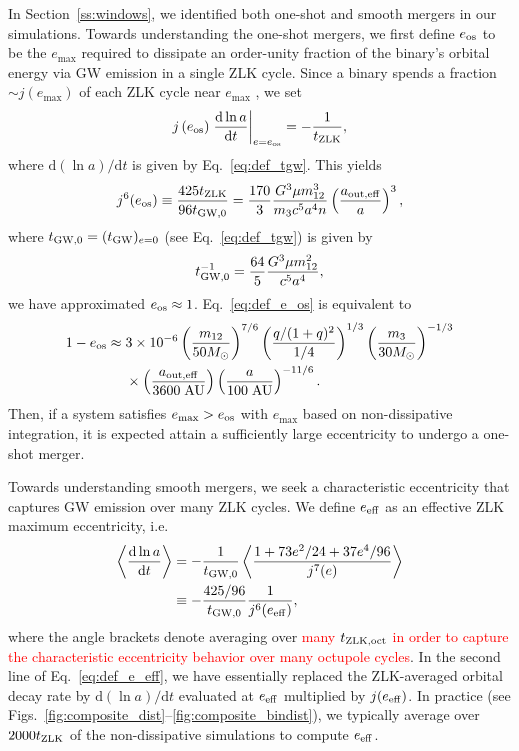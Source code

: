 \documentclass[
        fleqn,
        usenatbib,
    ]{mnras}
\newcommand*{\rd}[2]{\frac{\mathrm{d}#1}{\mathrm{d}#2}}
\newcommand*{\rdil}[2]{\mathrm{d}#1/\mathrm{d}#2}
\newcommand*{\at}[1]{\left.#1\right|}
\newcommand*{\ev}[1]{\left\langle#1\right\rangle}
\newcommand*{\p}[1]{\left(#1\right)}
\begin{document}
In Section~\ref{ss:windows}, we identified both one-shot and smooth mergers in
our simulations. Towards understanding the one-shot mergers, we first define
$e_{\rm os}$ to be the $e_{\max}$ required to dissipate an order-unity fraction
of the binary's orbital energy via GW emission in a single ZLK cycle. Since a
binary spends a fraction $\sim j(e_{\max})$ of each ZLK cycle near $e_{\max}$
\citep[e.g.,][]{anderson2016formation}, we set
\begin{align}
    j\p{e_{\rm os}}\at{\rd{\ln a}{t}}_{e = e_{\rm os}} =
        -\frac{1}{t_{\rm ZLK}},
\end{align}
where $\rdil{(\ln a)}{t}$ is given by Eq.~\eqref{eq:def_tgw}. This yields
\begin{align}
    j^6(e_{\rm os}) \equiv \frac{425 t_{\rm ZLK}}{96t_{\rm GW, 0}}
        =
        \frac{170}{3}
            \frac{G^3 \mu m_{12}^3}{m_3c^5a^4n}
            \p{\frac{a_{\rm out, eff}}{a}}^3,
            \label{eq:def_e_os}
\end{align}
where $t_{\rm GW, 0} = (t_{\rm GW})_{e = 0}$ (see Eq.~\ref{eq:def_tgw}) is given
by
\begin{align}
    t_{\rm GW, 0}^{-1} = \frac{64}{5}\frac{G^3 \mu m_{12}^2}{c^5a^4},
\end{align}
we have approximated $e_{\rm os} \approx 1$. Eq.~\eqref{eq:def_e_os} is
equivalent to
\begin{align}
    1 - e_{\rm os} \approx{}& 3 \times 10^{-6}
        \p{\frac{m_{12}}{50M_{\odot}}}^{7/6}
        \p{\frac{q / (1 + q)^2}{1/4}}^{1/3}
        \p{\frac{m_3}{30M_{\odot}}}^{-1/3}\nonumber\\
        &\times \p{\frac{a_{\rm out, eff}}{3600 \;\mathrm{AU}}}
            \p{\frac{a}{100\;\mathrm{AU}}}^{-11/6}.
\end{align}
Then, if a system satisfies $e_{\max} > e_{\rm os}$ with $e_{\max}$ based on
non-dissipative integration, it is expected attain a sufficiently large
eccentricity to undergo a one-shot merger.

Towards understanding smooth mergers, we seek a characteristic eccentricity that
captures GW emission over many ZLK cycles. We define $e_{\rm eff}$ as an
effective ZLK maximum eccentricity, i.e.
\begin{align}
    \ev{\rd{\ln a}{t}} &= -\frac{1}{t_{\rm GW, 0}}
            \ev{\frac{1 + 73e^2/24 + 37e^4/96}
                {j^7(e)}}\nonumber\\
        &\equiv -\frac{425/96}{t_{\rm GW, 0}}\frac{1}{j^6(e_{\rm eff})},
        \label{eq:def_e_eff}
\end{align}
where the angle brackets denote averaging over \textcolor{red}{many $t_{\rm ZLK,
oct}$ in order to capture the characteristic eccentricity behavior over many
octupole cycles}. In the second line of Eq.~\eqref{eq:def_e_eff}, we have
essentially replaced the ZLK-averaged orbital decay rate by $\rdil{(\ln a)}{t}$
evaluated at $e_{\rm eff}$ multiplied by $j(e_{\rm eff})$. In practice (see
Figs.~\ref{fig:composite_dist}--\ref{fig:composite_bindist}), we typically
average over $2000 t_{\rm ZLK}$ of the non-dissipative simulations to compute
$e_{\rm eff}$.
\end{document}
